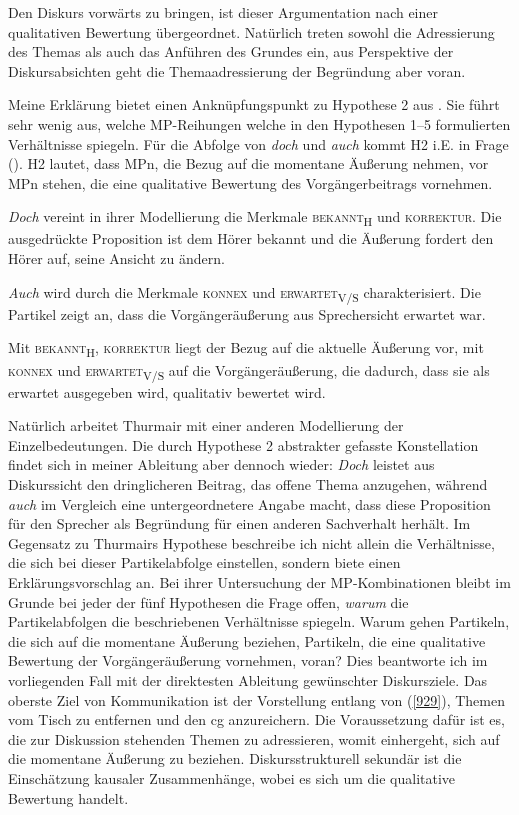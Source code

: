 {Den Diskurs vorwärts zu bringen, ist dieser Argumentation nach einer qualitativen Bewertung übergeordnet. Natürlich treten sowohl die Adressierung des Themas als auch das Anführen des Grundes ein, aus Perspektive der Diskursabsichten geht die Themaadressierung der Begründung aber voran.

Meine Erklärung bietet einen Anknüpfungspunkt zu Hypothese 2 aus \citet[288]{Thurmair1989}. Sie führt sehr wenig aus, welche MP-Reihungen welche in den Hypothesen 1–5 formulierten Verhältnisse spiegeln. Für die Abfolge von \textit{doch} und \textit{auch} kommt H2 i.E. in Frage (\citeyear[288]{Thurmair1989}). H2 lautet, dass MPn, die Bezug auf die momentane Äußerung nehmen, vor MPn stehen, die eine qualitative Bewertung des Vorgängerbeitrags vornehmen. 

\textit{Doch} vereint in ihrer Modellierung die Merkmale \textsc{bekannt}\textsubscript{H} und \textsc{korrektur}. Die ausgedrückte Proposition ist dem Hörer bekannt und die Äußerung fordert den Hörer auf, seine Ansicht zu ändern.

\textit{Auch} wird durch die Merkmale \textsc{konnex} und \textsc{erwartet}\textsubscript{V\slash S} charakterisiert. Die Partikel zeigt an, dass die Vorgängeräußerung aus Sprechersicht erwartet war.

Mit \textsc{bekannt}\textsubscript{H}, \textsc{korrektur} liegt der Bezug auf die aktuelle Äußerung vor, mit \textsc{konnex} und \textsc{erwartet}\textsubscript{V\slash S} auf die Vorgängeräußerung, die dadurch, dass sie als erwartet ausgegeben wird, qualitativ bewertet wird.

Natürlich arbeitet Thurmair mit einer anderen Modellierung der Einzelbedeutungen. Die durch Hypothese 2 abstrakter gefasste Konstellation findet sich in meiner Ableitung aber dennoch wieder: \textit{Doch} leistet aus Diskurssicht den dringlicheren Beitrag, das offene Thema anzugehen, während \textit{auch} im Vergleich eine untergeordnetere Angabe macht, dass diese Proposition für den Sprecher als Begründung für einen anderen Sachverhalt herhält. Im Gegensatz zu Thurmairs Hypothese beschreibe ich nicht allein die Verhältnisse, die sich bei dieser Partikelabfolge einstellen, sondern biete einen Erklärungsvorschlag an. Bei ihrer Untersuchung der MP-Kom\-bi\-na\-ti\-on\-en bleibt im Grunde bei jeder der fünf Hypothesen die Frage offen, \emph{warum} die Partikelabfolgen die beschriebenen Verhältnisse spiegeln. Warum gehen Partikeln, die sich auf die momentane Äußerung beziehen, Partikeln, die eine qualitative Bewertung der Vorgängeräußerung vor\-nehmen, voran? Dies beantworte ich im vorliegenden Fall mit der direktesten Ableitung gewünschter Diskursziele. Das oberste Ziel von Kommunikation ist der Vorstellung entlang von (\ref{929}), Themen vom Tisch zu entfernen und den cg anzureichern. Die Voraussetzung dafür ist es, die zur Diskussion stehenden Themen zu adressieren, womit einhergeht, sich auf die momentane Äußerung zu beziehen. Diskursstrukturell sekundär ist die Einschätzung kausaler Zusammenhänge, wobei es sich um die qualitative Bewertung handelt. 

}
